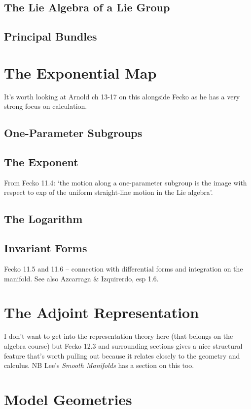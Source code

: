 \documentclass[oneside,english]{amsbook}
\numberwithin{section}{chapter}
\theoremstyle{plain}
\theoremstyle{definition}
\begin{document}
		\section{The Lie Algebra of a Lie Group}
		\section{Principal Bundles}

	\chapter{The Exponential Map}
		It's worth looking at Arnold ch 13-17 on this alongside Fecko as he has a very strong focus on calculation.
	
		\section{One-Parameter Subgroups}
		\section{The Exponent}
			From Fecko 11.4: `the motion along a one-parameter subgroup is the image with respect to exp of the uniform straight-line motion in the Lie algebra'.
		\section{The Logarithm}
		\section{Invariant Forms}
			Fecko 11.5 and 11.6 -- connection with differential forms and integration on the manifold. See also Azcarraga \& Izquirerdo, esp 1.6.

	\chapter{The Adjoint Representation}
		I don't want to get into the representation theory here (that belongs on the algebra course) but Fecko 12.3 and surrounding sections gives a nice structural feature that's worth pulling out because it relates closely to the geometry and calculus. NB Lee's \textit{Smooth Manifolds} has a section on this too.
	
	\chapter{Model Geometries}
\end{document}
